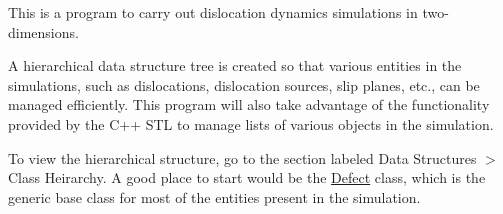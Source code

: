 This is a program to carry out dislocation dynamics simulations in two-\/dimensions.

A hierarchical data structure tree is created so that various entities in the simulations, such as dislocations, dislocation sources, slip planes, etc., can be managed efficiently. This program will also take advantage of the functionality provided by the C++ S\-T\-L to manage lists of various objects in the simulation.

To view the hierarchical structure, go to the section labeled Data Structures $>$ Class Heirarchy. A good place to start would be the \hyperlink{classDefect}{Defect} class, which is the generic base class for most of the entities present in the simulation. 